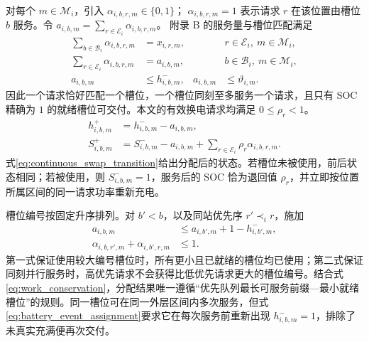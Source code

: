 \documentclass[12pt,a4paper,UTF8]{ctexart}
\begin{document}
对每个 $m\in\mathcal M_i$，引入
$\alpha_{i,b,r,m}\in\{0,1\}$；
$\alpha_{i,b,r,m}=1$ 表示请求 $r$ 在该位置由槽位 $b$ 服务。令
$a_{i,b,m}=\sum_{r\in\mathcal E_i}\alpha_{i,b,r,m}$。
附录 B 的服务量与槽位匹配满足
\begin{subequations}
\label{eq:battery_event_assignment}
\begin{align}
\sum_{b\in\mathcal B_i}\alpha_{i,b,r,m}
&=x_{i,r,m},
&&r\in\mathcal E_i,\ m\in\mathcal M_i,\\
\sum_{r\in\mathcal E_i}\alpha_{i,b,r,m}
&=a_{i,b,m},
&&b\in\mathcal B_i,\ m\in\mathcal M_i,\\
a_{i,b,m}&\le h_{i,b,m}^{-},&
a_{i,b,m}&\le \vartheta_{i,m}.
\end{align}
\end{subequations}
因此一个请求恰好匹配一个槽位，一个槽位同刻至多服务一个请求，且只有 SOC 精确为 $1$ 的就绪槽位可交付。本文的有效换电请求均满足 $0\le\rho_r<1$。
\begin{subequations}
\label{eq:continuous_swap_transition}
\begin{align}
h_{i,b,m}^{+}
&=h_{i,b,m}^{-}-a_{i,b,m},\\
S_{i,b,m}^{+}
&=S_{i,b,m}^{-}-a_{i,b,m}
+\sum_{r\in\mathcal E_i}\rho_r\alpha_{i,b,r,m}.
\end{align}
\end{subequations}
式\eqref{eq:continuous_swap_transition}给出分配后的状态。若槽位未被使用，前后状态相同；若被使用，则
$S_{i,b,m}^{-}=1$，服务后的 SOC 恰为退回值 $\rho_r$，并立即按位置所属区间的同一请求功率重新充电。

槽位编号按固定升序排列。对 $b'<b$，以及同站优先序 $r'\prec_i r$，施加
\begin{subequations}
\label{eq:smallest_ready_slot}
\begin{align}
a_{i,b,m}
&\le a_{i,b',m}+1-h_{i,b',m}^{-},\\
\alpha_{i,b,r',m}+\alpha_{i,b',r,m}
&\le1.
\end{align}
\end{subequations}
第一式保证使用较大编号槽位时，所有更小且已就绪的槽位均已使用；第二式保证同刻并行服务时，高优先请求不会获得比低优先请求更大的槽位编号。结合式\eqref{eq:work_conservation}，分配结果唯一遵循“优先队列最长可服务前缀—最小就绪槽位”的规则。同一槽位可在同一外层区间内多次服务，但式\eqref{eq:battery_event_assignment}要求它在每次服务前重新出现 $h_{i,b,m}^{-}=1$，排除了未真实充满便再次交付。
\end{document}
